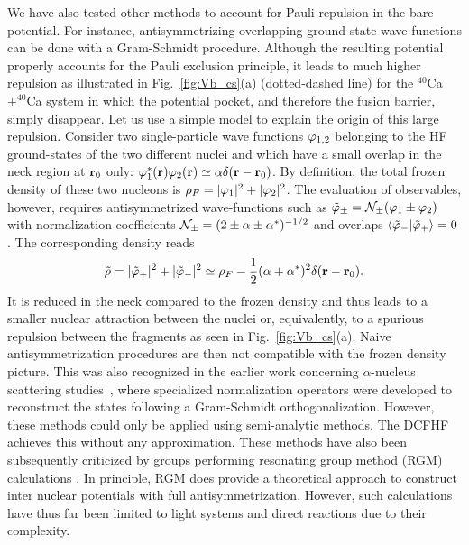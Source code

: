 We have also tested other methods to account for Pauli repulsion in the bare potential.
For instance, antisymmetrizing overlapping ground-state wave-functions
\citep{fliessbach1971,brink1975,zint1975} can be done with a Gram-Schmidt procedure.
Although the resulting potential properly accounts for the Pauli exclusion principle,
it leads to much higher repulsion as illustrated in Fig.~\ref{fig:Vb_cs}(a) (dotted-dashed line)
for the $^{40}$Ca$+^{40}$Ca system in which the potential pocket, 
and therefore the fusion barrier, simply disappear.
Let us use a simple model to explain the origin of this large repulsion.
Consider two single-particle wave functions $\varphi_{1,2}$ belonging to the HF ground-states of
the two different nuclei and which have a small overlap in the neck region at ${\bf r}_0$ only:
$\varphi_1^*({\bf r})\varphi_2({\bf r})\simeq \alpha \delta({\bf r}-{\bf r}_0)$.
By definition, the total frozen density of these two nucleons is $\rho_F=|\varphi_1|^2+|\varphi_2|^2$.
The evaluation of observables, however, requires antisymmetrized wave-functions such as
$\tilde{\varphi}_\pm=\mathcal{N}_{\pm}(\varphi_1\pm\varphi_2)$ with  normalization coefficients
$\mathcal{N}_\pm=(2\pm\alpha\pm\alpha^*)^{-1/2}$ and overlaps $\langle\tilde{\varphi}_-|\tilde{\varphi}_+\rangle=0$.
The corresponding density reads
$$\tilde\rho=|\tilde{\varphi}_+|^2+|\tilde{\varphi}_-|^2\simeq\rho_F-\frac{1}{2}(\alpha+\alpha^*)^2\delta({\bf r}-{\bf r}_0).$$
It is reduced in the neck compared to the frozen density and thus leads to a smaller nuclear attraction
between the nuclei or, equivalently, to a spurious repulsion between the fragments 
as seen in Fig.~\ref{fig:Vb_cs}(a).
Naive antisymmetrization procedures are then not compatible with the frozen density picture.
This was also recognized in the earlier work concerning $\alpha$-nucleus scattering studies \,\citep{fliessbach1975},
where specialized normalization operators were developed to reconstruct the states following a
Gram-Schmidt orthogonalization. However, these methods could only be applied using semi-analytic
methods. The DCFHF achieves this without any approximation.
These methods have also been subsequently criticized by groups 
performing resonating group method (RGM) calculations \citep{aoki1983,wada1987,tohsaki1975,tang1978}. 
In principle, RGM does provide a theoretical approach to construct inter nuclear 
potentials with full antisymmetrization. However, such calculations 
have thus far been limited to light systems and direct reactions due to their 
complexity. 

